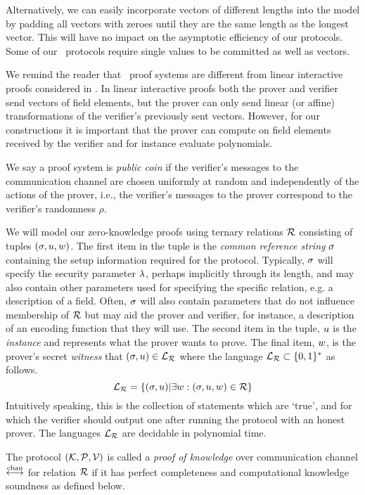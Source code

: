 Alternatively, we can easily incorporate vectors of different lengths into the model by padding all vectors with zeroes until they are the same length as the longest vector. This will have no impact on the asymptotic efficiency of our protocols. Some of our \ILC\ protocols require single values to be committed as well as vectors. 

We remind the reader that \ILC\ proof systems are different from linear interactive proofs considered in \cite{BitanskyCIPO13}. In linear interactive proofs both the prover and verifier send vectors of field elements, but the prover can only send linear (or affine) transformations of the verifier's previously sent vectors. However, for our constructions it is important that the prover can compute on field elements received by the verifier and for instance evaluate polynomials.

We say a proof system is \emph{public coin} if the verifier's messages to the communication channel are chosen uniformly at random and independently of the actions of the prover, i.e., the verifier's messages to the prover correspond to the verifier's randomness $\rho$.

We will model our zero-knowledge proofs using ternary relations $\mathcal{R}$ consisting of tuples $(\mathsf{\sigma}, u,w)$. The first item in the tuple is the \emph{common reference string} $\mathsf{\sigma}$ containing the setup information required for the protocol. Typically, $\mathsf{\sigma}$ will specify the security parameter $\lambda$, perhaps implicitly through its length, and may also contain other parameters used for specifying the specific relation, e.g. a description of a field. Often, $\mathsf{\sigma}$ will also contain parameters that do not influence membership of $\mathcal{R}$ but may aid the prover and verifier, for instance, a description of an encoding function that they will use. The second item in the tuple, $u$ is the \emph{instance} and represents what the prover wants to prove. The final item, $w$, is the prover's secret \emph{witness} that $(\mathsf{\sigma},u)\in\mathcal{L}_{\mathcal{R}}$ where the language $\mathcal{L}_{\mathcal{R}} \subset \{0,1\}^*$ as follows.
\[ \mathcal{L}_{\mathcal{R}}=\{(\mathsf{\sigma},u)|\exists w: (\mathsf{\sigma},u,w)\in \mathcal{R}\} \]
Intuitively speaking, this is the collection of statements which are `true', and for which the verifier should output one after running the protocol with an honest prover. The languages $\mathcal{L}_{\mathcal{R}}$ are decidable in polynomial time.

The protocol $(\mathcal{K},\mathcal{P},\mathcal{V})$ is called a \emph{proof of knowledge} over communication channel $\overset{\textnormal{chan}}{\longleftrightarrow}$ for relation $\mathcal{R}$ if it has perfect completeness and computational knowledge soundness as defined below.

